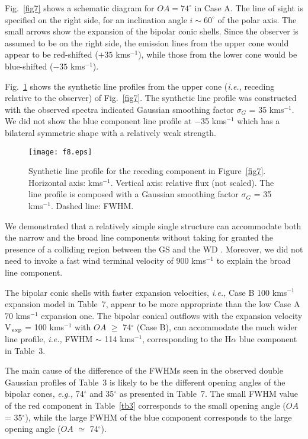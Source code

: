 \documentclass[a4paper,fleqn,usenatbib,useAMS]{mnras}
\def\eg{{\it e.g.,} }
\def\ie{{\it i.e.,} }
\def\ha{H{$\alpha$}}
\def\kms{km\hspace{1pt}s$^{-1}$}
\begin{document}
{{Fig.~\ref{fig7} shows a schematic diagram for $OA = 74^{\circ}$ in Case A.
The line of sight is specified on the right side, for an inclination angle $i \sim 60^{\circ}$ of the polar axis. The small arrows show the expansion of the bipolar conic shells. Since the observer is assumed to be on the right side, the emission lines from the upper cone would appear to be red-shifted ($+35$ {\kms}), while those from the lower cone would be blue-shifted ($-35$ {\kms}).



Fig.~\ref{fig8} shows the synthetic line profiles from the upper cone (\ie receding relative to the observer) of Fig.~\ref{fig7}.
The synthetic line profile was constructed with the observed spectra indicated Gaussian smoothing factor $\sigma_G$ = 35 {\kms}.
We did not show the blue component line profile at $-$35 {\kms} which has a bilateral symmetric shape with a relatively weak strength.





\begin{figure}
  \centering
\texttt{[image: f8.eps]}
\caption{Synthetic line profile for the receding component in Figure~\ref{fig7}.  Horizontal axis: {\kms}. Vertical axis: relative flux (not scaled).
The line profile is composed with a Gaussian smoothing factor  $\sigma_G$ = 35 {\kms}. Dashed line:  FWHM. }
\label{fig8}
\end{figure}






We demonstrated that a relatively simple single structure can accommodate both the narrow and the broad line components without taking for granted the presence of a colliding region between the GS and the WD \citep{nus95, mur95}. Moreover, we did not need to invoke a fast wind terminal velocity of 900 {\kms} \citep{pen85} to explain the broad line component.


The bipolar conic shells with faster expansion velocities, \ie Case B 100 {\kms} expansion model in Table~7, appear to be more appropriate than the low Case A 70 {\kms} expansion one. The bipolar conical outflows with the expansion velocity V$_{\rm exp}$ = 100 {\kms} with $OA$ $\geq$ 74$^{\circ}$ (Case B), can accommodate the much wider line profile, \ie FWHM $\sim$  114 {\kms}, corresponding to the {\ha} blue component in Table~3.

The main cause of the difference of the FWHMs seen in the observed double Gaussian profiles of Table~3 is likely to be the different opening angles of the bipolar cones, \eg 74$^{\circ}$ and 35$^{\circ}$ as presented in Table~7.
The small FWHM value of the red component in Table~\ref{tb3} corresponds to the small opening angle ($OA$ = 35$^{\circ}$), while the large FWHM of the blue component corresponds to the large opening angle ($OA$ $\simeq$ 74$^{\circ}$).

}}
\end{document}
